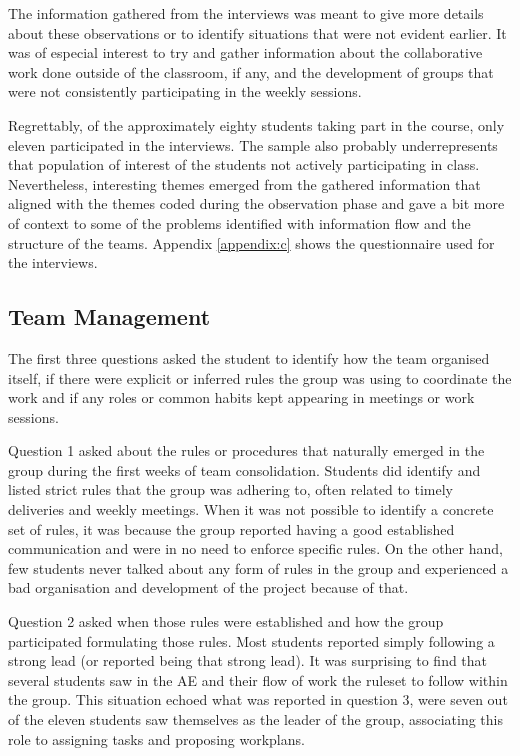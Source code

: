 The information gathered from the interviews was meant to give more details about these observations or to identify situations that were not evident earlier. It was of
especial interest to try and gather information about the collaborative work done outside of the classroom, if any, and the development of groups that were not
consistently participating in the weekly sessions.

Regrettably, of the approximately eighty students taking part in the course, only eleven participated in the interviews. The sample also probably underrepresents that
population of interest of the students not actively participating in class. Nevertheless, interesting themes emerged from the gathered information that aligned with the
themes coded during the observation phase and gave a bit more of context to some of the problems identified with information flow and the structure of the teams.
Appendix \ref{appendix:c} shows the questionnaire used for the interviews.

\subsection{Team Management \label{sec:6-9-1}}

The first three questions asked the student to identify how the team organised itself, if there were explicit or inferred rules the group was using to coordinate the work
and if any roles or common habits kept appearing in meetings or work sessions.

Question 1 asked about the rules or procedures that naturally emerged in the group during the first weeks of team consolidation. Students did identify and listed strict
rules that the group was adhering to, often related to timely deliveries and weekly meetings. When it was not possible to identify a concrete set of rules, it was because
the group reported having a good established communication and were in no need to enforce specific rules. On the other hand, few students never talked about any form of
rules in the group and experienced a bad organisation and development of the project because of that.

Question 2 asked when those rules were established and how the group participated formulating those rules. Most students reported simply following a strong lead (or
reported being that strong lead). It was surprising to find that several students saw in the \ac{AE} and their flow of work the ruleset to follow within the group. This
situation echoed what was reported in question 3, were seven out of the eleven students saw themselves as the leader of the group, associating this role to assigning
tasks and proposing workplans.

